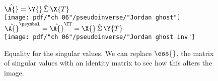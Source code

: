 \begin{figure}[htbp] %
   \centering
   $\hat{\A{}} = \Y{}\,\hat{\Sigma}\,\X{T}$ \\[10pt]
   \texttt{[image: pdf/"ch 06"/pseudoinverse/"Jordan ghost"]} \\[20pt]
   $\hat{\A{}}^{\psymbol} = \hat{\A{}}^{\TT}= \X{}\,\hat{\Sigma}\,\Y{T}$ \\[10pt]
   \texttt{[image: pdf/"ch 06"/pseudoinverse/"Jordan ghost inv"]} 
   \caption[Equality for the singular values]{Equality for the singular values. We can replace $\ess{}$, the matrix of singular values with an identity matrix to see how this alters the image.}
   \label{fig:jordan:pseudoinverse:ghost}
\end{figure}

\endinput